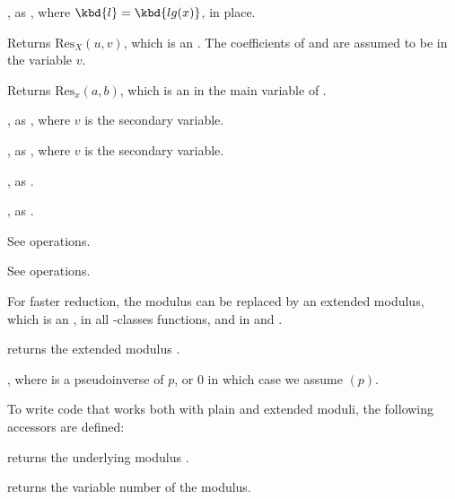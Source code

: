
, as , where
$\kbd{l} = \kbd{lg(x)}$, in place.

 Returns
$\text{Res}_X(u, v)$, which is an . The coefficients of 
and  are assumed to be in the variable $v$.


Returns $\text{Res}_x(a, b)$, which is an 
in the main variable of .

, as ,
where $v$ is the secondary variable.

, as ,
where $v$ is the secondary variable.

, as .

, as
.

 See  operations.


 See  operations.


For faster reduction, the modulus  can be replaced by an extended
modulus, which is an , in all -classes
functions, and in  and .

 returns the extended modulus
.

, where 
is a pseudoinverse of $p$, or $0$ in which case we assume
$(p)$.

To write code that works both with plain and extended moduli, the following
accessors are defined:

 returns the underlying modulus .

 returns the variable number of the modulus.


